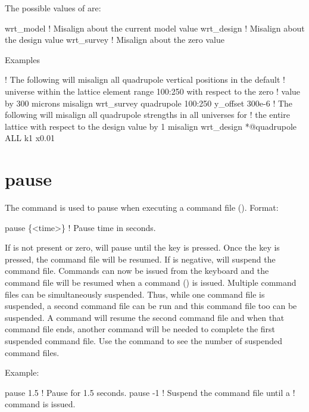 The possible values of  are:
\begin{example}
  wrt_model          ! Misalign about the current model value
  wrt_design         ! Misalign about the design value
  wrt_survey         ! Misalign about the zero value
\end{example}

Examples
\begin{example}
   ! The following will misalign all quadrupole vertical positions in the default
   ! universe within the lattice element range 100:250 with respect to the zero 
   ! value by 300 microns
  misalign wrt_survey quadrupole 100:250 y_offset 300e-6
   ! The following will misalign all quadrupole strengths in all universes for
   ! the entire lattice with respect to the design value by 1%
  misalign wrt_design *@quadrupole ALL k1 x0.01
\end{example}

\section{pause}
\label{s:pause}

The  command is used to pause \tao when executing a command
file (). Format:
\begin{example}
  pause \{<time>\} ! Pause time in seconds.
\end{example}
\vskip 0.2in

If  is not present or zero, \tao will pause until the
 key is pressed. Once the  key is pressed, the command
file will be resumed. If  is negative, \tao will suspend
the command file. Commands can now be issued from the keyboard and the
command file will be resumed when a  command
() is issued. Multiple command files can be
simultaneously suspended.  Thus, while one command file is suspended, a
second command file can be run and this command file too can be
suspended. A  command will resume the second command file
and when that command file ends, another  command will be
needed to complete the first suspended command file. Use the  command to see the number of suspended command files.

Example:
\begin{example}
  pause 1.5    ! Pause for 1.5 seconds.
  pause -1     ! Suspend the command file until a  
               !   command is issued.
\end{example}

